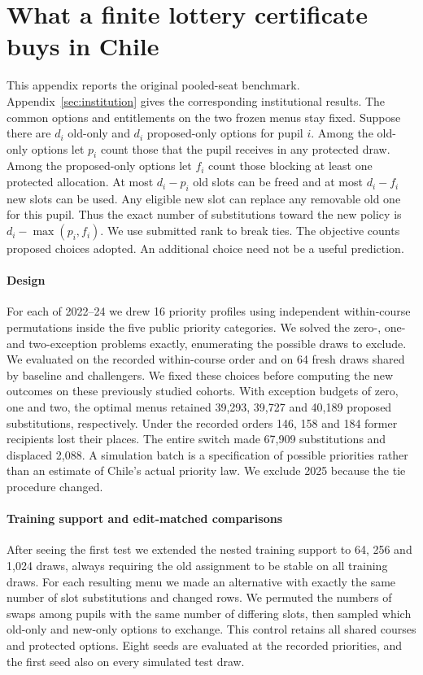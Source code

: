 \section{What a finite lottery certificate buys in Chile}\label{sec:lottery-tests}
This appendix reports the original pooled-seat benchmark. Appendix~\ref{sec:institution} gives the corresponding institutional results. The common options and entitlements on the two frozen menus stay fixed. Suppose there are $d_i$ old-only and $d_i$ proposed-only options for pupil $i$. Among the old-only options let $p_i$ count those that the pupil receives in any protected draw. Among the proposed-only options let $f_i$ count those blocking at least one protected allocation. At most $d_i-p_i$ old slots can be freed and at most $d_i-f_i$ new slots can be used. Any eligible new slot can replace any removable old one for this pupil. Thus the exact number of substitutions toward the new policy is $d_i-\max(p_i,f_i)$. We use submitted rank to break ties. The objective counts proposed choices adopted. An additional choice need not be a useful prediction.

\paragraph{Design}
For each of 2022--24 we drew 16 priority profiles using independent within-course permutations inside the five public priority categories. We solved the zero-, one- and two-exception problems exactly, enumerating the possible draws to exclude. We evaluated on the recorded within-course order and on 64 fresh draws shared by baseline and challengers. We fixed these choices before computing the new outcomes on these previously studied cohorts. With exception budgets of zero, one and two, the optimal menus retained 39,293, 39,727 and 40,189 proposed substitutions, respectively. Under the recorded orders 146, 158 and 184 former recipients lost their places. The entire switch made 67,909 substitutions and displaced 2,088. A simulation batch is a specification of possible priorities rather than an estimate of Chile's actual priority law. We exclude 2025 because the tie procedure changed.

\paragraph{Training support and edit-matched comparisons}
After seeing the first test we extended the nested training support to 64, 256 and 1,024 draws, always requiring the old assignment to be stable on all training draws. For each resulting menu we made an alternative with exactly the same number of slot substitutions and changed rows. We permuted the numbers of swaps among pupils with the same number of differing slots, then sampled which old-only and new-only options to exchange. This control retains all shared courses and protected options. Eight seeds are evaluated at the recorded priorities, and the first seed also on every simulated test draw.

